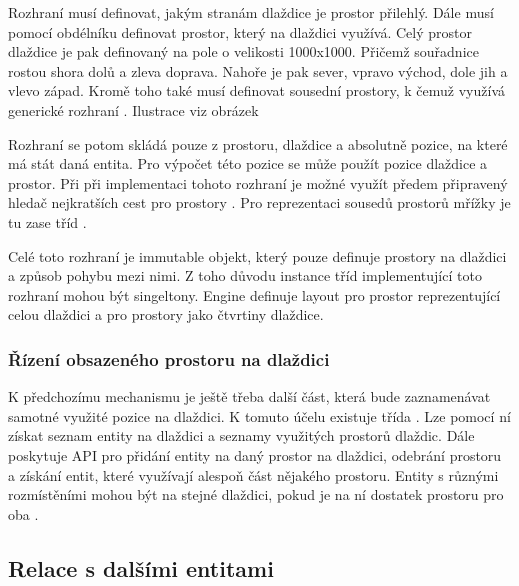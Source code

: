Rozhraní  musí definovat, jakým stranám dlaždice je prostor přilehlý. Dále musí pomocí obdélníku definovat prostor, který na dlaždici využívá.
Celý prostor dlaždice je pak definovaný na pole o velikosti 1000x1000. Přičemž souřadnice rostou
shora dolů a zleva doprava. Nahoře je pak sever, vpravo východ, dole jih a vlevo západ. Kromě toho také musí definovat sousední
prostory, k čemuž využívá generické rozhraní . Ilustrace viz obrázek 



Rozhraní  se potom skládá pouze z prostoru, dlaždice a absolutně pozice, na které má stát daná entita.
Pro výpočet této pozice se může použít pozice dlaždice a prostor. Při při implementaci tohoto rozhraní je možné využít 
předem připravený hledač nejkratších cest pro prostory . Pro reprezentaci sousedů prostorů mřížky je tu 
zase tříd .

Celé toto rozhraní je immutable objekt, který pouze definuje prostory na dlaždici a způsob pohybu mezi nimi. Z toho důvodu
instance tříd implementující toto rozhraní mohou být singeltony. Engine definuje layout pro prostor reprezentující celou dlaždici
a pro prostory jako čtvrtiny dlaždice.

\subsubsection{Řízení obsazeného prostoru na dlaždici}

K předchozímu mechanismu je ještě třeba další část, která bude zaznamenávat samotné využité pozice na dlaždici. K tomuto 
účelu existuje třída .  Lze pomocí ní získat seznam entity na dlaždici a seznamy využitých prostorů dlaždic.
Dále poskytuje API pro přidání entity na daný prostor na dlaždici, odebrání prostoru a získání entit, které využívají 
alespoň část nějakého prostoru. Entity s různými rozmístěními mohou být na stejné dlaždici, pokud
je na ní dostatek prostoru pro oba .


\subsection{Relace s dalšími entitami}\label{entities-relations}

